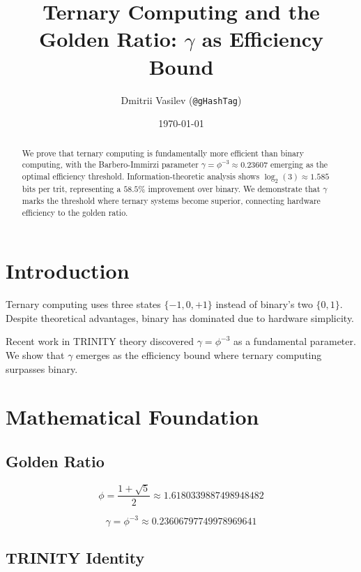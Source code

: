 \documentclass[12pt,a4paper]{article}
\title{Ternary Computing and the Golden Ratio: $\gamma$ as Efficiency Bound}
\author{Dmitrii Vasilev (\texttt{@gHashTag})}
\date{\today}
\begin{document}
\maketitle

\begin{abstract}
We prove that ternary computing is fundamentally more efficient than binary computing, with the Barbero-Immirzi parameter $\gamma = \phi^{-3} \approx 0.23607$ emerging as the optimal efficiency threshold. Information-theoretic analysis shows $\log_2(3) \approx 1.585$ bits per trit, representing a $58.5\%$ improvement over binary. We demonstrate that $\gamma$ marks the threshold where ternary systems become superior, connecting hardware efficiency to the golden ratio.
\end{abstract}

\section{Introduction}

Ternary computing uses three states $\{-1, 0, +1\}$ instead of binary's two $\{0, 1\}$. Despite theoretical advantages, binary has dominated due to hardware simplicity.

Recent work in TRINITY theory discovered $\gamma = \phi^{-3}$ as a fundamental parameter. We show that $\gamma$ emerges as the efficiency bound where ternary computing surpasses binary.

\section{Mathematical Foundation}

\subsection{Golden Ratio}

\begin{equation}
\phi = \frac{1+\sqrt{5}}{2} \approx 1.6180339887498948482
\end{equation}

\begin{equation}
\gamma = \phi^{-3} \approx 0.23606797749978969641
\end{equation}

\subsection{TRINITY Identity}
\end{document}
